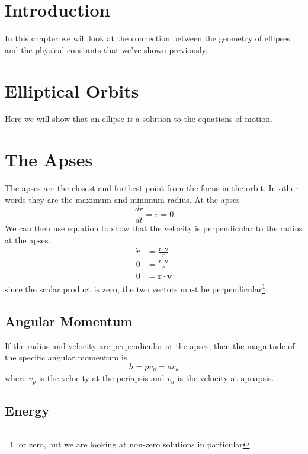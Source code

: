 \section{Introduction}

In this chapter we will look at the connection between the geometry of
ellipses and the physical constants that we've shown previously.

\section{Elliptical Orbits}

Here we will show that an ellipse is a solution to the equations of motion.

\section{The Apses}

The apses are the closest and furthest point from the focus in the orbit. 
In other words they are the maximum and minimum radius. At the apses
\begin{equation}
\frac{d r}{dt}=\dot{r} = 0
\end{equation}
We can then use equation  to show that the velocity is
perpendicular to the radius at the apses.
\begin{align}
\dot{r} &= \frac{\mathbf{r}\cdot\mathbf{v}}{r} \nonumber \\
0 &= \frac{\mathbf{r}\cdot\mathbf{v}}{r} \nonumber \\
0 &= \mathbf{r}\cdot\mathbf{v}
\end{align}
since the scalar product is zero, the two vectors must be 
perpendicular\footnote{or zero, but we are looking at non-zero solutions in
particular}. 

\subsection{Angular Momentum}

If the radius and velocity are perpendicular at the apses, then the magnitude
of the specific angular momentum is
\begin{equation}
h=p v_p = a v_a
\end{equation} 
where $v_p$ is the velocity at the periapsis and $v_a$ is the velocity at apoapsis.

\subsection{Energy}

